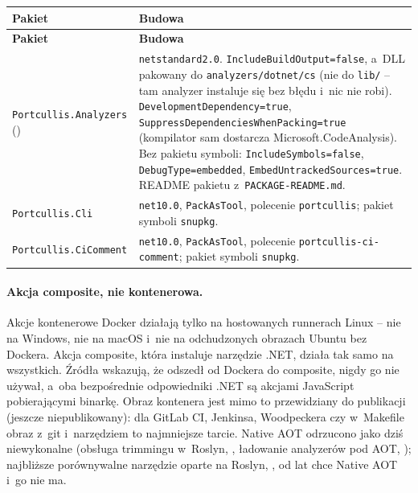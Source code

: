 \begingroup\small
\begin{xltabular}{\linewidth}{@{}>{\raggedright\arraybackslash}p{4.0cm} >{\raggedright\arraybackslash}X@{}}
\toprule
\textbf{Pakiet} & \textbf{Budowa} \\
\midrule
\endfirsthead
\toprule
\textbf{Pakiet} & \textbf{Budowa} \\
\midrule
\endhead
\texttt{Portcullis.Analyzers} () & \texttt{netstandard2.0}. \texttt{IncludeBuildOutput=false}, a~DLL pakowany do \texttt{analyzers/dotnet/cs} (nie do \texttt{lib/} -- tam analyzer instaluje się bez błędu i~nic nie robi). \texttt{DevelopmentDependency=true}, \texttt{SuppressDependenciesWhenPacking=true} (kompilator sam dostarcza Microsoft.CodeAnalysis). Bez pakietu symboli: \texttt{IncludeSymbols=false}, \texttt{DebugType=embedded}, \texttt{EmbedUntrackedSources=true}. README pakietu z~\texttt{PACKAGE-README.md}. \\
\texttt{Portcullis.Cli} & \texttt{net10.0}, \texttt{PackAsTool}, polecenie \texttt{portcullis}; pakiet symboli \texttt{snupkg}. \\
\texttt{Portcullis.CiComment} & \texttt{net10.0}, \texttt{PackAsTool}, polecenie \texttt{portcullis-ci-comment}; pakiet symboli \texttt{snupkg}. \\
\bottomrule
\end{xltabular}
\endgroup

\paragraph{Akcja composite, nie kontenerowa.} Akcje kontenerowe Docker działają tylko na
hostowanych runnerach Linux -- nie na Windows, nie na macOS i~nie na odchudzonych obrazach
Ubuntu bez Dockera. Akcja composite, która instaluje narzędzie .NET, działa tak samo na
wszystkich. Źródła wskazują, że  odszedł od Dockera do composite,
 nigdy go nie używał, a~oba bezpośrednie odpowiedniki .NET są
akcjami JavaScript pobierającymi binarkę. Obraz kontenera jest mimo to przewidziany do
publikacji (jeszcze niepublikowany): dla
GitLab CI, Jenkinsa, Woodpeckera czy  w~Makefile obraz z~git
i~narzędziem to najmniejsze tarcie. Native AOT odrzucono jako dziś niewykonalne (obsługa
trimmingu w~Roslyn, , ładowanie analyzerów pod AOT,
); najbliższe porównywalne narzędzie oparte na Roslyn,
, od lat chce Native AOT i~go nie ma.

